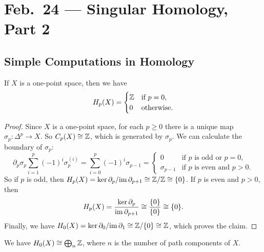 \chapter{Feb.~24 --- Singular Homology, Part 2}

\section{Simple Computations in Homology}

\begin{lemma}
  If $X$ is a one-point space, then we have
  \[
    H_p(X) =
    \begin{cases}
      \mathbb{Z} & \text{if $p = 0$}, \\
      0 & \text{otherwise}.
    \end{cases}
  \]
\end{lemma}

\begin{proof}
  Since $X$ is a one-point space, for each $p \ge 0$
  there is a unique map $\sigma_p : \Delta^p \to X$.
  So $C_p(X) \cong \mathbb{Z}$, which is generated by $\sigma_p$.
  We can calculate the boundary of $\sigma_p$:
  \[
    \partial_p \sigma_p \sum_{i = 1}^p (-1)^i \sigma_p^{(i)}
    = \sum_{i = 0}^p (-1)^i \sigma_{p - 1}
    =
    \begin{cases}
      0 & \text{if $p$ is odd or $p = 0$}, \\
      \sigma_{p - 1} & \text{if $p$ is even and $p > 0$}.
    \end{cases}
  \]
  So if $p$ is odd, then $H_p(X) = \ker \partial_p / {\operatorname{im} \partial_{p + 1}} \cong \mathbb{Z} / \mathbb{Z} \cong \{0\}$.
  If $p$ is even and $p > 0$, then
  \[H_p(X) = \frac{\ker \partial_p}{\operatorname{im} \partial_{p + 1}} \cong \frac{\{0\}}{\{0\}} \cong \{0\}.\]
  Finally, we have $H_0(X) = \ker \partial_0 / {\operatorname{im} \partial_1} \cong \mathbb{Z} / \{0\} \cong \mathbb{Z}$, which proves
  the claim.
\end{proof}

\begin{theorem}
  We have $H_0(X) \cong \bigoplus_n \mathbb{Z}$,
  where $n$ is the number of path components of $X$.
\end{theorem}

